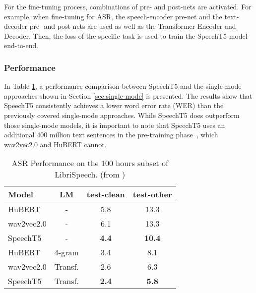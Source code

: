 For the fine-tuning process, combinations of pre- and post-nets are activated. For example, when fine-tuning for ASR, the speech-encoder pre-net and the text-decoder pre- and post-nets are used as well as the Transformer Encoder and Decoder. Then, the loss of the specific task is used to train the SpeechT5 model end-to-end.
\subsubsection{Performance}
In Table \ref{table:speecht5_performance}, a performance comparison between SpeechT5 and the single-mode approaches shown in Section \ref{sec:single-mode} is presented. The results show that SpeechT5 consistently achieves a lower word error rate (WER) than the previously covered single-mode approaches. While SpeechT5 does outperform those single-mode models, it is important to note that SpeechT5 uses an additional 400 million text sentences in the pre-training phase~\cite{speecht5}, which wav2vec2.0 and HuBERT cannot.

\begin{table}[htbp]
    \centering
    \begin{tabular}{l c c c}
    \hline
    \textbf{Model} & LM & test-clean & test-other\\
    \hline
    HuBERT&-&5.8&13.3\\
    wav2vec2.0&-&6.1&13.3\\
    SpeechT5&-&\textbf{4.4}&\textbf{10.4}\\
    \hline
    HuBERT&4-gram&3.4&8.1\\
    wav2vec2.0&Transf.&2.6&6.3\\
    SpeechT5&Transf.&\textbf{2.4}&\textbf{5.8}\\
    \hline
    \end{tabular}
    \caption{\label{table:speecht5_performance}ASR Performance on the 100 hours subset of LibriSpeech. (from \cite{speecht5})}
\end{table}